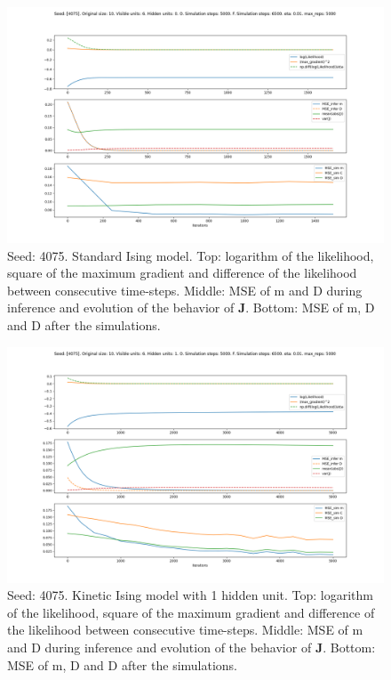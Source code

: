 \documentclass{article}
\def\*#1{\mathbf{#1}}
\begin{document}
\begin{figure}[!htb]
    \centering
    \includegraphics[width=0.7\linewidth]{images/sqrt_size/[4075]_10_6_0_5000_6500_eta001_5000_100.png}
\caption{Seed: 4075. Standard Ising model. Top: logarithm of the likelihood, square of the maximum gradient and difference of the likelihood between consecutive time-steps. Middle: MSE of m and D during inference and evolution of the behavior of $\*J$. Bottom: MSE of m, D and D after the simulations.}
\end{figure}


\begin{figure}[!htb]
    \centering
    \includegraphics[width=0.7\linewidth]{images/sqrt_size/[4075]_10_6_1_5000_6500_eta001_5000_100.png}
\caption{Seed: 4075. Kinetic Ising model with 1 hidden unit. Top: logarithm of the likelihood, square of the maximum gradient and difference of the likelihood between consecutive time-steps. Middle: MSE of m and D during inference and evolution of the behavior of $\*J$. Bottom: MSE of m, D and D after the simulations.}
\end{figure}
\end{document}
